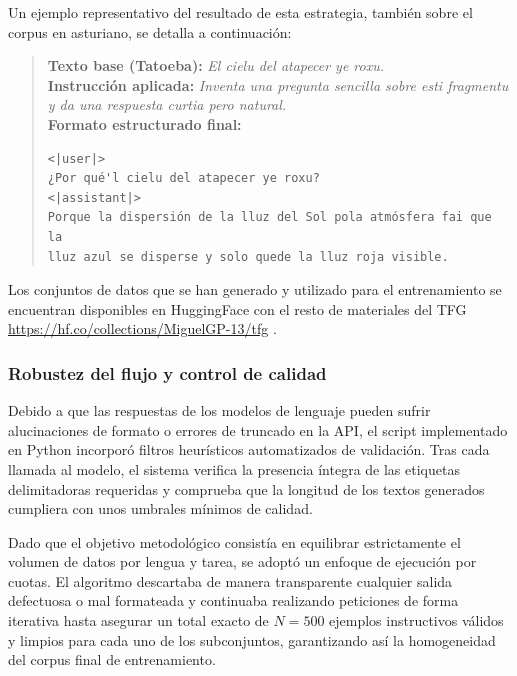 \begin{itemize}
    Un ejemplo representativo del resultado de esta estrategia, también sobre el corpus en asturiano, se detalla a continuación:

    \begin{quotation}
        \noindent\textbf{Texto base (Tatoeba):} \textit{El cielu del atapecer ye roxu.}\\
        \textbf{Instrucción aplicada:} \textit{Inventa una pregunta sencilla sobre esti fragmentu y da una respuesta curtia pero natural.}\\
        
        \noindent\textbf{Formato estructurado final:}
        \begin{Verbatim}
<|user|>
¿Por qué'l cielu del atapecer ye roxu?
<|assistant|>
Porque la dispersión de la lluz del Sol pola atmósfera fai que la 
lluz azul se disperse y solo quede la lluz roja visible.
        \end{Verbatim}
    \end{quotation}
\end{itemize}

Los conjuntos de datos que se han generado y utilizado para el entrenamiento se encuentran disponibles en HuggingFace con el resto de materiales del TFG \url{https://hf.co/collections/MiguelGP-13/tfg} \cite{lexicons_2025, galician_instructive_2025, asturian_instructive_2025, aranes_instructive_2025, asturian_annotated_2025, galician_annotated_2025, aranes_annotated_2025, asturian_cloze_2025, galician_cloze_2025, aranes_cloze_2025}.

\subsubsection{Robustez del flujo y control de calidad}
Debido a que las respuestas de los modelos de lenguaje pueden sufrir alucinaciones de formato o errores de truncado en la API, el script implementado en Python incorporó filtros heurísticos automatizados de validación. Tras cada llamada al modelo, el sistema verifica la presencia íntegra de las etiquetas delimitadoras requeridas y comprueba que la longitud de los textos generados cumpliera con unos umbrales mínimos de calidad. 

Dado que el objetivo metodológico consistía en equilibrar estrictamente el volumen de datos por lengua y tarea, se adoptó un enfoque de ejecución por cuotas. El algoritmo descartaba de manera transparente cualquier salida defectuosa o mal formateada y continuaba realizando peticiones de forma iterativa hasta asegurar un total exacto de $N=500$ ejemplos instructivos válidos y limpios para cada uno de los subconjuntos, garantizando así la homogeneidad del corpus final de entrenamiento.


